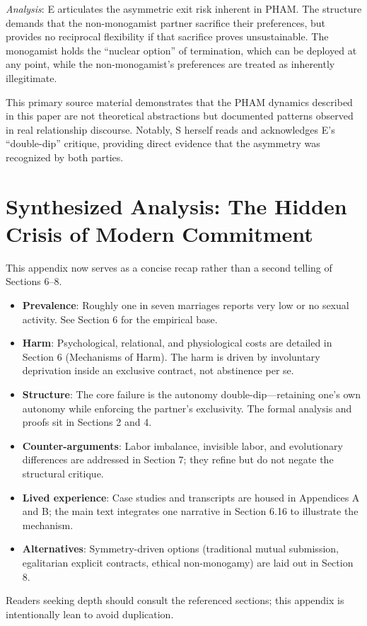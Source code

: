 \documentclass[12pt, letterpaper]{article}
\begin{document}
\textit{Analysis}: E articulates the asymmetric exit risk inherent in PHAM. The structure demands that the non-monogamist partner sacrifice their preferences, but provides no reciprocal flexibility if that sacrifice proves unsustainable. The monogamist holds the ``nuclear option'' of termination, which can be deployed at any point, while the non-monogamist's preferences are treated as inherently illegitimate.

This primary source material demonstrates that the PHAM dynamics described in this paper are not theoretical abstractions but documented patterns observed in real relationship discourse. Notably, S herself reads and acknowledges E's ``double-dip'' critique, providing direct evidence that the asymmetry was recognized by both parties.

\newpage
\section{Synthesized Analysis: The Hidden Crisis of Modern Commitment}

This appendix now serves as a concise recap rather than a second telling of Sections 6--8.

\begin{itemize}
    \item \textbf{Prevalence}: Roughly one in seven marriages reports very low or no sexual activity. See Section 6 for the empirical base.
    \item \textbf{Harm}: Psychological, relational, and physiological costs are detailed in Section 6 (Mechanisms of Harm). The harm is driven by involuntary deprivation inside an exclusive contract, not abstinence per se.
    \item \textbf{Structure}: The core failure is the autonomy double-dip---retaining one's own autonomy while enforcing the partner's exclusivity. The formal analysis and proofs sit in Sections 2 and 4.
    \item \textbf{Counter-arguments}: Labor imbalance, invisible labor, and evolutionary differences are addressed in Section 7; they refine but do not negate the structural critique.
    \item \textbf{Lived experience}: Case studies and transcripts are housed in Appendices A and B; the main text integrates one narrative in Section 6.16 to illustrate the mechanism.
    \item \textbf{Alternatives}: Symmetry-driven options (traditional mutual submission, egalitarian explicit contracts, ethical non-monogamy) are laid out in Section 8.
\end{itemize}

Readers seeking depth should consult the referenced sections; this appendix is intentionally lean to avoid duplication.
\end{document}
